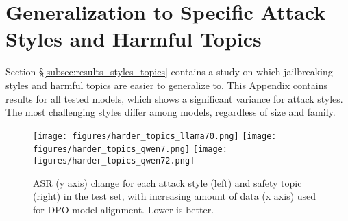 \section{Generalization to Specific Attack Styles and Harmful Topics}\label{app:harder_topics_all_models}

Section \S\ref{subsec:results_styles_topics} contains a study on which jailbreaking styles and harmful topics are easier to generalize to. This Appendix contains results for all tested models, which shows a significant variance for attack styles. \ie The most challenging styles differ among models, regardless of size and family. 

\begin{figure}[ht]
  \centering
  \texttt{[image: figures/harder\_topics\_llama70.png]}
  \texttt{[image: figures/harder\_topics\_qwen7.png]}
  \texttt{[image: figures/harder\_topics\_qwen72.png]}
  \caption{ASR (y axis) change for each attack style (left) and safety topic (right) in the \bscrt{} test set, with increasing amount of data (x axis) used for DPO model alignment. Lower is better.}\label{fig:topics_sizes_all_models}
\end{figure}